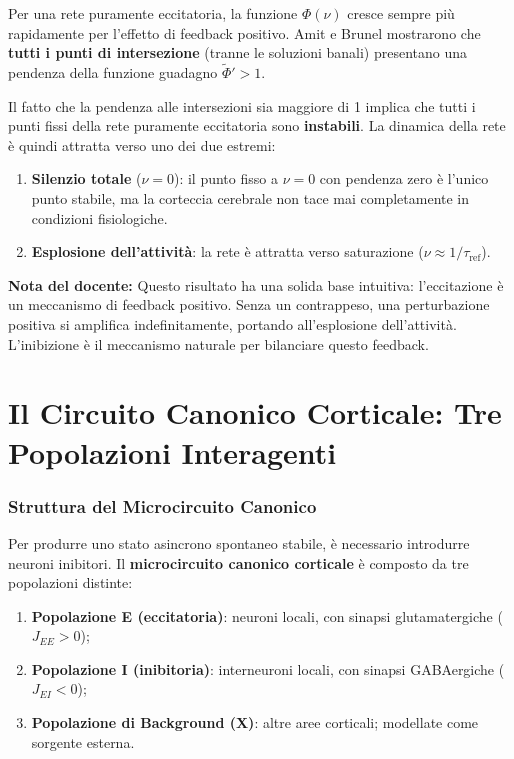 Per una rete puramente eccitatoria, la funzione $\Phi(\nu)$ cresce sempre più rapidamente per l'effetto di feedback positivo. Amit e Brunel mostrarono che \textbf{tutti i punti di intersezione} (tranne le soluzioni banali) presentano una pendenza della funzione guadagno $\tilde{\Phi}' > 1$.

Il fatto che la pendenza alle intersezioni sia maggiore di 1 implica che tutti i punti fissi della rete puramente eccitatoria sono \textbf{instabili}. La dinamica della rete è quindi attratta verso uno dei due estremi:
\begin{enumerate}
    \item \textbf{Silenzio totale} ($\nu = 0$): il punto fisso a $\nu = 0$ con pendenza zero è l'unico punto stabile, ma la corteccia cerebrale non tace mai completamente in condizioni fisiologiche.
    \item \textbf{Esplosione dell'attività}: la rete è attratta verso saturazione ($\nu \approx 1/\tau_{\text{ref}}$).
\end{enumerate}

\begin{tcolorbox}[colback=gray!5, colframe=gray!40, arc=2mm, boxrule=0.5pt]
\textbf{Nota del docente:} Questo risultato ha una solida base intuitiva: l'eccitazione è un meccanismo di feedback positivo. Senza un contrappeso, una perturbazione positiva si amplifica indefinitamente, portando all'esplosione dell'attività. L'inibizione è il meccanismo naturale per bilanciare questo feedback.
\end{tcolorbox}

\section{Il Circuito Canonico Corticale: Tre Popolazioni Interagenti}

\subsubsection{Struttura del Microcircuito Canonico}

Per produrre uno stato asincrono spontaneo stabile, è necessario introdurre neuroni inibitori. Il \textbf{microcircuito canonico corticale} è composto da tre popolazioni distinte:

\begin{enumerate}
    \item \textbf{Popolazione E (eccitatoria)}: neuroni locali, con sinapsi glutamatergiche ($J_{EE} > 0$);
    \item \textbf{Popolazione I (inibitoria)}: interneuroni locali, con sinapsi GABAergiche ($J_{EI} < 0$);
    \item \textbf{Popolazione di Background (X)}: altre aree corticali; modellate come sorgente esterna.
\end{enumerate}

